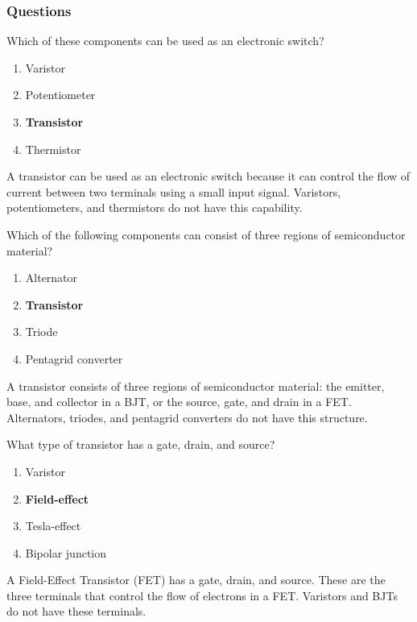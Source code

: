 \subsubsection{Questions}
\begin{tcolorbox}[colback=gray!10!white,colframe=black!75!black,title={T6B03}]
    Which of these components can be used as an electronic switch?
    \begin{enumerate}[label=\Alph*),noitemsep]
        \item Varistor
        \item Potentiometer
        \item \textbf{Transistor}
        \item Thermistor
    \end{enumerate}
\end{tcolorbox}
A transistor can be used as an electronic switch because it can control the flow of current between two terminals using a small input signal. Varistors, potentiometers, and thermistors do not have this capability.

\begin{tcolorbox}[colback=gray!10!white,colframe=black!75!black,title={T6B04}]
    Which of the following components can consist of three regions of semiconductor material?
    \begin{enumerate}[label=\Alph*),noitemsep]
        \item Alternator
        \item \textbf{Transistor}
        \item Triode
        \item Pentagrid converter
    \end{enumerate}
\end{tcolorbox}
A transistor consists of three regions of semiconductor material: the emitter, base, and collector in a BJT, or the source, gate, and drain in a FET. Alternators, triodes, and pentagrid converters do not have this structure.

\begin{tcolorbox}[colback=gray!10!white,colframe=black!75!black,title={T6B05}]
    What type of transistor has a gate, drain, and source?
    \begin{enumerate}[label=\Alph*),noitemsep]
        \item Varistor
        \item \textbf{Field-effect}
        \item Tesla-effect
        \item Bipolar junction
    \end{enumerate}
\end{tcolorbox}
A Field-Effect Transistor (FET) has a gate, drain, and source. These are the three terminals that control the flow of electrons in a FET. Varistors and BJTs do not have these terminals.


